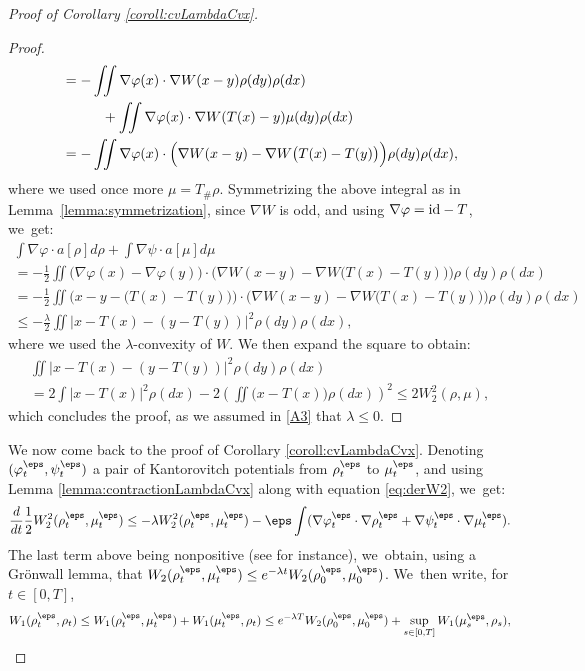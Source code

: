 \begin{proof}[Proof of Corollary \ref{coroll:cvLambdaCvx}]
\begin{proof}
\begin{align*}
& = - \iint \nabla \varphi(x) \cdot \nabla W(x-y) \rho(dy) \rho(dx) \\
& \hspace*{1cm} + \iint \nabla \varphi(x) \cdot \nabla W(T(x)-y)\mu(dy)\rho(dx) \\
& = - \iint \nabla \varphi(x) \cdot \Big(\nabla W(x-y) - \nabla W\big(T(x)-T(y)\big)\Big) \rho(dy) \rho(dx),
\end{align*}
where we used once more $\mu = T_\# \rho$. Symmetrizing the above integral as in Lemma~\ref{lemma:symmetrization}, since $\nabla W$ is odd, and using $\nabla \varphi = \textup{id} - T$, we~get:
\begin{multline*}
\int \nabla \varphi \cdot a[\rho] d\rho + \int \nabla \psi \cdot a[\mu] d\mu \\
= - \frac 12 \iint \big(\nabla \varphi(x) - \nabla \varphi(y)\big) \cdot \Big(\nabla W(x-y) - \nabla W\big(T(x)-T(y)\big)\Big) \rho(dy) \rho(dx) \\
= - \frac 12 \iint \Big(x - y - \big(T(x) - T(y)\big)\Big) \cdot \Big(\nabla W(x-y) - \nabla W\big(T(x)-T(y)\big)\Big) \rho(dy) \rho(dx) \\
\leq - \frac{\lambda}{2} \iint |x - T(x) - (y - T(y))|^2 \rho(dy) \rho(dx),
\end{multline*}
where we used the $\lambda$-convexity of $W$.
We then expand the square to obtain:
\begin{multline*}
\iint |x - T(x) - (y - T(y))|^2 \rho(dy) \rho(dx) \\
= 2 \int |x - T(x)|^2 \rho(dx) - 2 \left(\iint \big(x - T(x)\big) \rho(dx)\right)^2 \leq 2 W_2^2(\rho, \mu),
\end{multline*}
which concludes the proof, as we assumed in \eqref{A3} that $\lambda \leq 0$.
\end{proof}
We now come back to the proof of Corollary \ref{coroll:cvLambdaCvx}. Denoting $(\varphi_t^\eps, \psi_t^\eps)$ a pair of Kantorovitch potentials from $\rho_t^\eps$ to $\mu_t^\eps$, and using Lemma \ref{lemma:contractionLambdaCvx} along with equation \eqref{eq:derW2}, we~get:
\[
\frac{d}{dt} \frac 12 W_2^2(\rho_t^\eps, \mu_t^\eps) \leq -\lambda W_2^2(\rho_t^\eps, \mu_t^\eps) - \eps \int (\nabla \varphi_t^\eps \cdot \nabla \rho_t^\eps + \nabla \psi_t^\eps \cdot \nabla \mu_t^\eps).
\]
The last term above being nonpositive (see \cite[Exer.\,66]{otam15} for instance), we~obtain, using a Grönwall lemma, that $W_2(\rho_t^\eps, \mu_t^\eps) \leq e^{-\lambda t} W_2(\rho_0^\eps, \mu_0^\eps)$. We~then write, for $t \in [0,T]$,
\[
W_1(\rho_t^\eps, \rho_t) \leq W_1(\rho_t^\eps, \mu_t^\eps) + W_1(\mu_t^\eps, \rho_t) \leq e^{-\lambda T} W_2(\rho_0^\eps, \mu_0^\eps) + \sup_{s \in [0,T]} W_1(\mu_s^\eps, \rho_s),
\]
\end{proof}

